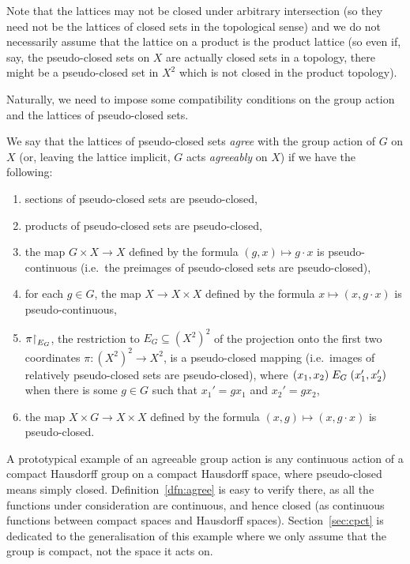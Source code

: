 	Note that the lattices may not be closed under arbitrary intersection (so they need not be the lattices of closed sets in the topological sense) and we do not necessarily assume that the lattice on a product is the product lattice (so even if, say, the pseudo-closed sets on $X$ are actually closed sets in a topology, there might be a pseudo-closed set in $X^2$ which is not closed in the product topology).
	
	Naturally, we need to impose some compatibility conditions on the group action and the lattices of pseudo-closed sets.
	
	\begin{dfn}
		\label{dfn:agree}
		We say that the lattices of pseudo-closed sets \emph{agree} with the group action of $G$ on $X$ (or, leaving the lattice implicit, $G$ acts \emph{agreeably} on $X$) if we have the following:
		\begin{enumerate}
			\item
			sections of pseudo-closed sets are pseudo-closed,
			\item
			products of pseudo-closed sets are pseudo-closed,
			\item
			the map $G\times X\to X$ defined by the formula $(g,x)\mapsto g\cdot x$ is pseudo-continuous (i.e.\, the preimages of pseudo-closed sets are pseudo-closed),
			\item
			for each $g\in G$, the map $X\to X\times X$ defined by the formula $x\mapsto (x,g\cdot x)$ is pseudo-continuous,
			\item
			\label{it:dfn:agree:proj}
			$\pi\mathord{\upharpoonright}_{E_G}$, the restriction to $E_G\subseteq (X^2)^2$ of the projection onto the first two coordinates $\pi\colon (X^2)^2\to X^2$, is a pseudo-closed mapping (i.e.\ images of relatively pseudo-closed sets are pseudo-closed), where $(x_1,x_2)\mathrel{E}_G (x_1',x_2')$ when there is some $g\in G$ such that $x_1'=gx_1$ and $x_2'=gx_2$,
			\item
			the map $X\times G\to X\times X$ defined by the formula $(x,g)\mapsto(x,g\cdot x)$ is pseudo-closed.\xqed{\lozenge}
		\end{enumerate}
	\end{dfn}
	
	\begin{ex}
		\label{ex:agree_cpct}
		A prototypical example of an agreeable group action is any continuous action of a compact Hausdorff group on a compact Hausdorff space, where pseudo-closed means simply closed. Definition~\ref{dfn:agree} is easy to verify there, as all the functions under consideration are continuous, and hence closed (as continuous functions between compact spaces and Hausdorff spaces). Section~\ref{sec:cpct} is dedicated to the generalisation of this example where we only assume that the group is compact, not the space it acts on.\xqed{\lozenge}
	\end{ex}
	
